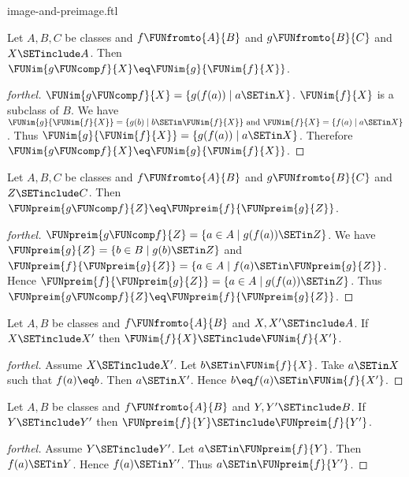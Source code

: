 \documentclass{naproche-library}
\begin{document}
\begin{smodule}[title=Computation Laws for Images and Preimages]{image-and-preimage.ftl}
\begin{proposition}[forthel,id=FOUNDATIONS_07_5628919411638272]
  Let $A, B, C$ be classes and $f \FUNfromto{A}{B}$ and $g \FUNfromto{B}{C}$ and $X \SETinclude A$.
  Then $\FUNim{g \FUNcomp f}{X} \eq \FUNim{g}{\FUNim{f}{X}}$.
\end{proposition}
\begin{proof}[forthel]
  $\FUNim{g \FUNcomp f}{X} = \{ g(f(a)) \mid a \SETin X \}$.
  $\FUNim{f}{X}$ is a subclass of $B$.
  We have $\FUNim{g}{\FUNim{f}{X}} = \{ g(b) \mid b \SETin \FUNim{f}{X} \}\text{ and }\FUNim{f}{X} = \{ f(a) \mid a \SETin X \}$.
  Thus $\FUNim{g}{\FUNim{f}{X}} = \{ g(f(a)) \mid a \SETin X \}$.
  Therefore $\FUNim{g \FUNcomp f}{X} \eq \FUNim{g}{\FUNim{f}{X}}$.
\end{proof}

\begin{proposition}[forthel,id=FOUNDATIONS_07_6824917886566400]
  Let $A, B, C$ be classes and $f \FUNfromto{A}{B}$ and $g \FUNfromto{B}{C}$ and $Z \SETinclude C$.
  Then $\FUNpreim{g \FUNcomp f}{Z} \eq \FUNpreim{f}{\FUNpreim{g}{Z}}$.
\end{proposition}
\begin{proof}[forthel]
  $\FUNpreim{g \FUNcomp f}{Z} = \{ a \in A \mid g(f(a)) \SETin Z \}$.
  We have $\FUNpreim{g}{Z} = \{ b \in B \mid g(b) \SETin Z \}$ and $\FUNpreim{f}{\FUNpreim{g}{Z}} = \{ a \in A \mid f(a) \SETin \FUNpreim{g}{Z} \}$.
  Hence $\FUNpreim{f}{\FUNpreim{g}{Z}} = \{ a \in A \mid g(f(a)) \SETin Z \}$.
  Thus $\FUNpreim{g \FUNcomp f}{Z} \eq \FUNpreim{f}{\FUNpreim{g}{Z}}$.
\end{proof}

\begin{proposition}[forthel,id=FOUNDATIONS_07_7396318576115712]
  Let $A, B$ be classes and $f \FUNfromto{A}{B}$ and $X, X' \SETinclude A$.
  If $X \SETinclude X'$ then $\FUNim{f}{X} \SETinclude \FUNim{f}{X'}$.
\end{proposition}
\begin{proof}[forthel]
  Assume $X \SETinclude X'$.
  Let $b \SETin \FUNim{f}{X}$.
  Take $a \SETin X$ such that $f(a) \eq b$.
  Then $a \SETin X'$.
  Hence $b \eq f(a) \SETin \FUNim{f}{X'}$.
\end{proof}

\begin{proposition}[forthel,id=FOUNDATIONS_07_8376448628817920]
  Let $A, B$ be classes and $f \FUNfromto{A}{B}$ and $Y, Y' \SETinclude B$.
  If $Y \SETinclude Y'$ then $\FUNpreim{f}{Y} \SETinclude \FUNpreim{f}{Y'}$.
\end{proposition}
\begin{proof}[forthel]
  Assume $Y \SETinclude Y'$.
  Let $a \SETin \FUNpreim{f}{Y}$.
  Then $f(a) \SETin Y$.
  Hence $f(a) \SETin Y'$.
  Thus $a \SETin \FUNpreim{f}{Y'}$.
\end{proof}


\end{smodule}
\end{document}
